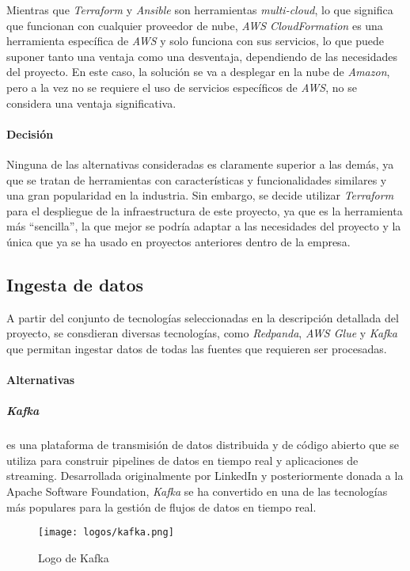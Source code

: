 Mientras que \textit{Terraform} y \textit{Ansible} son herramientas
\textit{multi-cloud}, lo que significa que funcionan con cualquier proveedor de
nube, \textit{AWS CloudFormation} es una herramienta específica de \textit{AWS}
y solo funciona con sus servicios, lo que puede suponer tanto una ventaja como
una desventaja, dependiendo de las necesidades del proyecto. En este caso, la
solución se va a desplegar en la nube de \textit{Amazon}, pero a la vez no se
requiere el uso de servicios específicos de \textit{AWS}, no se considera una
ventaja significativa.

\paragraph{Decisión}
Ninguna de las alternativas consideradas es claramente superior a las demás, ya
que se tratan de herramientas con características y funcionalidades similares y
una gran popularidad en la industria. Sin embargo, se decide utilizar
\textit{Terraform} para el despliegue de la infraestructura de este proyecto,
ya que es la herramienta más ``sencilla'', la que mejor se podría adaptar a las
necesidades del proyecto y la única que ya se ha usado en proyectos anteriores
dentro de la empresa.


\subsection{Ingesta de datos}\label{subsec:ingesta}
A partir del conjunto de tecnologías seleccionadas en la descripción detallada
del proyecto, se consdieran diversas tecnologías, como \textit{Redpanda},
\textit{AWS Glue} y \textit{Kafka} que permitan ingestar datos de todas las
fuentes que requieren ser procesadas.

\paragraph{Alternativas}
\subparagraph{Kafka} es una plataforma de transmisión de datos distribuida y de
código abierto que se utiliza para construir pipelines de datos en tiempo real y
aplicaciones de streaming. Desarrollada originalmente por LinkedIn y
posteriormente donada a la Apache Software Foundation, \textit{Kafka} se ha
convertido en una de las tecnologías más populares para la gestión de flujos de
datos en tiempo real.

\begin{figure}[H]
	\centering
	\texttt{[image: logos/kafka.png]}
	\caption{Logo de Kafka~\textregistered}
	\label{fig:kafka}
\end{figure}

